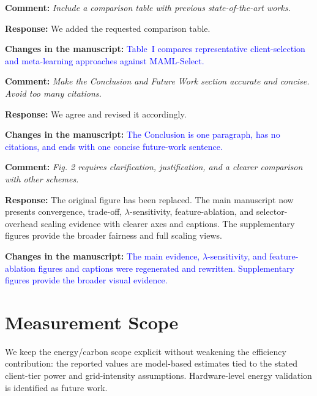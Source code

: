 \documentclass[11pt]{article}
\newcommand{\comment}[1]{\textbf{Comment:} \textit{#1}}
\newcommand{\response}[1]{\textbf{Response:} #1}
\newcommand{\change}[1]{\textbf{Changes in the manuscript:} \textcolor{blue}{#1}}
\begin{document}
\comment{Include a comparison table with previous state-of-the-art works.}

\response{We added the requested comparison table.}

\change{Table~I compares representative client-selection and meta-learning approaches against MAML-Select.}

\comment{Make the Conclusion and Future Work section accurate and concise. Avoid too many citations.}

\response{We agree and revised it accordingly.}

\change{The Conclusion is one paragraph, has no citations, and ends with one concise future-work sentence.}

\comment{Fig. 2 requires clarification, justification, and a clearer comparison with other schemes.}

\response{The original figure has been replaced. The main manuscript now presents convergence, trade-off, $\lambda$-sensitivity, feature-ablation, and selector-overhead scaling evidence with clearer axes and captions. The supplementary figures provide the broader fairness and full scaling views.}

\change{The main evidence, $\lambda$-sensitivity, and feature-ablation figures and captions were regenerated and rewritten. Supplementary figures provide the broader visual evidence.}

\section*{Measurement Scope}

We keep the energy/carbon scope explicit without weakening the efficiency contribution: the reported values are model-based estimates tied to the stated client-tier power and grid-intensity assumptions. Hardware-level energy validation is identified as future work.
\end{document}
